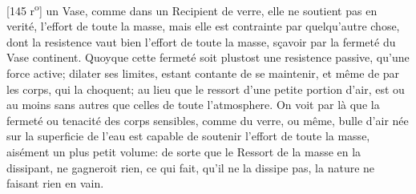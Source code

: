 [145 r\textsuperscript{o}] un Vase, comme dans un Recipient de verre, elle ne soutient pas en verit\'{e}, l'effort de toute la masse, mais elle est contrainte par quelqu'autre chose, dont la resistence vaut bien l'effort de toute la masse, s\c{c}avoir par la fermet\'{e} du Vase continent. Quoyque cette fermet\'{e} soit plustost une resistence passive, qu'une force active;  dilater ses limites, estant contante de se maintenir, et même de  par  les corps, qui la choquent; au lieu que le ressort d'une petite portion d'air, est  ou au moins sans autres que celles de toute l'atmosphere\protect{}. On voit par l\`{a} que la fermet\'{e} ou tenacit\'{e} des corps\protect{} sensibles, comme du verre, ou même,  bulle d'air n\'{e}e sur la superficie de l'eau est capable de soutenir l'effort de toute la masse,  ais\'{e}ment un plus petit volume: de sorte que le Ressort de la masse en la dissipant, ne gagneroit rien, ce qui fait, qu'il ne la dissipe pas, la nature ne faisant rien en vain.\pend
